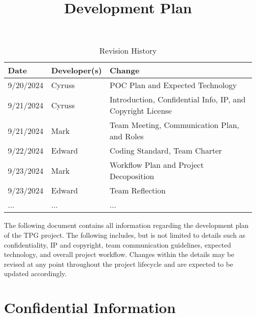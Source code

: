 \documentclass{article}
\title{Development Plan\\\progname}
\author{\authname}
\date{}
\begin{document}
\maketitle

\begin{table}[hp]
\caption{Revision History} \label{TblRevisionHistory}
\begin{tabularx}{\textwidth}{llX}
\toprule
\textbf{Date} & \textbf{Developer(s)} & \textbf{Change}\\
\midrule
9/20/2024 & Cyruss & POC Plan and Expected Technology\\
9/21/2024 & Cyruss & Introduction, Confidential Info, IP, and Copyright License\\
9/21/2024 & Mark & Team Meeting, Communication Plan, and Roles\\
9/22/2024 & Edward & Coding Standard, Team Charter\\
9/23/2024 & Mark & Workflow Plan and Project Decoposition\\
9/23/2024 & Edward & Team Reflection\\
... & ... & ...\\
\bottomrule
\end{tabularx}
\end{table}

\newpage{}



\noindent The following document contains all information regarding the development plan of the TPG project. The following includes, but is not limited to details such as confidentiality, IP and copyright, team communication guidelines, expected technology, and overall project workflow. Changes within the details may be revised at any point throughout the project lifecycle and are expected to be updated accordingly.
\section{Confidential Information}

\end{document}
